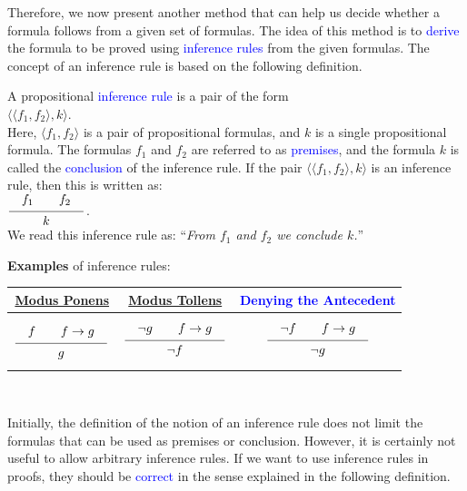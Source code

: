 Therefore, we now present another method that can help us decide
whether a formula follows from a given set of formulas. The idea of this method
is to \textcolor{blue}{derive} the formula to be proved using \textcolor{blue}{inference rules} from the
given formulas. The concept of an inference rule is based on the following definition. 
\begin{Definition} \hspace*{\fill} \linebreak
    A propositional \textcolor{blue}{inference rule} is a pair of the form  
    \\[0.2cm]
    \hspace*{1.3cm}
    $\bigl\langle \langle f_1, f_2 \rangle, k \bigr\rangle$.    
    \\[0.2cm]
    Here, $\langle f_1, f_2 \rangle$ is a pair of propositional formulas, and $k$ is a
    single propositional formula.   The formulas $f_1$ and $f_2$ are referred to as
    \textcolor{blue}{premises}, and the formula $k$ is called the \textcolor{blue}{conclusion} of the inference
    rule. If the pair $\bigl\langle \langle f_1, f_2 \rangle, k \bigr\rangle$ is an inference rule, then this is written as: 
    \\[0.3cm]
    \hspace*{1.3cm}      
    $\schluss{f_1 \qquad f_2}{k}$.
    \\[0.3cm]
    We read this inference rule as: 
    ``\textsl{From $f_1$ and $f_2$ we  conclude $k$.}''
    \eox
\end{Definition}

\noindent
\textbf{Examples} of inference rules:
\\[0.2cm]
\hspace*{1.3cm}            
\begin{tabular}[t]{|c|c|c|}
\hline
\rule{0pt}{15pt} \href{https://en.wikipedia.org/wiki/Modus_ponens}{Modus Ponens} & \href{https://en.wikipedia.org/wiki/Modus_tollens}{Modus Tollens} & \textcolor{blue}{Denying the Antecedent} \\[0.3cm]
\hline
$
\rule[-15pt]{0pt}{40pt}\schluss{f \quad\quad f \rightarrow g}{g}$ &
$\schluss{\neg g \quad\quad f \rightarrow g}{\neg f}$ &
$\schluss{\neg f \quad\quad f \rightarrow g}{\neg g}$ \\[0.3cm]
\hline
\end{tabular}
\\[0.3cm]\mbox{}

\noindent
Initially, the definition of the notion of an inference rule does not limit the formulas that can be used as premises
or conclusion. However, it is certainly not useful to allow arbitrary inference rules. If we want to use
inference rules in proofs, they should be \textcolor{blue}{correct} in the sense explained in the following definition.

